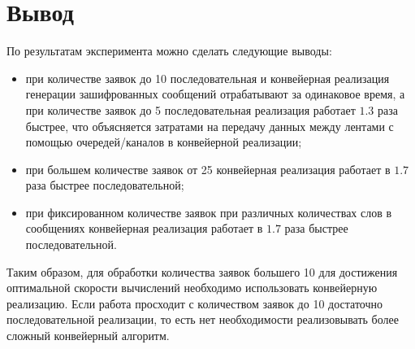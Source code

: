 
%

\clearpage
\section{Вывод}

По результатам эксперимента можно сделать следующие выводы:
\begin{itemize}[left=\parindent]
    \item при количестве заявок до 10 последовательная и конвейерная
         реализация генерации зашифрованных сообщений отрабатывают за
         одинаковое время, а при количестве заявок до 5 последовательная
         реализация работает $1.3$ раза быстрее, что объясняется затратами
         на передачу данных между лентами с помощью очередей/каналов
         в конвейерной реализации;
    \item при большем количестве заявок от 25 конвейерная реализация работает в
        $1.7$ раза быстрее последовательной;
    \item при фиксированном количестве заявок при различных количествах слов в
        сообщениях конвейерная реализация работает в $1.7$ раза быстрее
        последовательной.
\end{itemize}

Таким образом, для обработки количества заявок большего 10 для достижения
оптимальной скорости вычислений необходимо использовать конвейерную реализацию.
Если работа просходит с количеством заявок до 10 достаточно последовательной
реализации, то есть нет необходимости реализовывать более сложный конвейерный
алгоритм.
